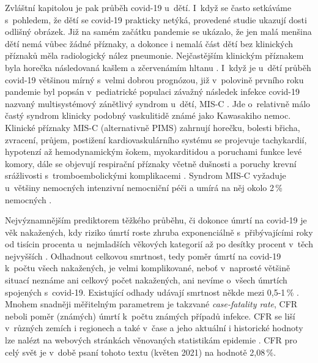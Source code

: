 Zvláštní kapitolou je pak průběh covid-19 u~dětí. I~když se často setkáváme s~pohledem, že dětí se covid-19 prakticky netýká, provedené studie ukazují dosti odlišný obrázek. Již na samém začátku pandemie se ukázalo, že jen malá menšina dětí nemá vůbec žádné příznaky, a dokonce i nemalá část dětí bez klinických příznaků měla radiologický nález pneumonie. Nejčastějším klinickým příznakem byla horečka následovaná kašlem a zčervenámím hltanu \cite{Lu:2020b}. I~když je u~dětí průběh covid-19 většinou mírný s~velmi dobrou prognózou, již v~polovině prvního roku pandemie byl popsán v~pediatrické populaci závažný následek infekce covid-19 nazvaný multisystémový zánětlivý syndrom u~dětí, MIS-C \cite{Feldstein:2020}. Jde o~relativně málo častý syndrom klinicky podobný vaskulitidě známé jako Kawasakiho nemoc. Klinické příznaky MIS-C (alternativně PIMS) zahrnují horečku, bolesti břicha, zvracení, průjem, postižení kardiovaskulárního systému se projevuje tachykardií, hypotenzí až hemodynamickým šokem, myokarditidou a poruchami funkce levé komory, dále se objevují respirační příznaky včetně dušnosti a poruchy krevní srážlivosti s~tromboembolickými komplikacemi \cite{Hoste:2021}. Syndrom MIS-C vyžaduje u~většiny nemocných intenzivní nemocniční péči a umírá na něj okolo 2\,\% nemocných \cite{Hoste:2021}.

Nejvýznamnějším prediktorem těžkého průběhu, či dokonce úmrtí na covid-19 je věk nakažených, kdy riziko úmrtí roste zhruba exponenciálně s~přibývajícími roky od tisícin procenta u~nejmladších věkových kategorií až po desítky procent v~těch nejvyšších \cite{ODriscoll:2020}. Odhadnout celkovou smrtnost, tedy poměr úmrtí na covid-19 k~počtu všech nakažených, je velmi komplikované, neboť v~naprosté většině situací neznáme ani celkový počet nakažených, ani nevíme o~všech úmrtích spojených s~covid-19. Existující odhady udávají smrtnost někde mezi 0,5-1\,\% \cite{Meyerowitz-Katz:2020}. Mnohem snadněji měřitelným parametrem je takzvané \textit{case-fatality rate}, CFR neboli poměr (známých) úmrtí k~počtu známých případů infekce. CFR se liší v~různých zemích i regionech a také v~čase a jeho aktuální i historické hodnoty lze nalézt na webových stránkách věnovaných statistikám epidemie \cite{owidcoronavirus}. CFR pro celý svět je v~době psaní tohoto textu (květen 2021) na hodnotě 2,08\,\%.

